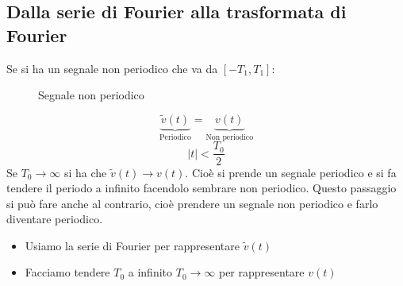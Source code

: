 \documentclass[a4paper]{article}
\begin{document}
\subsection{Dalla serie di Fourier alla trasformata di Fourier}
Se si ha un segnale non periodico che va da \( \left[ -T_1, T_1 \right] \):
\begin{figure}[H]
  \centering
  \caption{Segnale non periodico}
\end{figure}

\[
  \underbrace{\tilde{v}(t)}_{\text{Periodico}} = \underbrace{v(t)}_{\text{Non periodico}}
\] 
\[
|t| < \frac{T_0}{2}
\] 
Se \( T_0 \to \infty \) si ha che \( \tilde{v}(t) \to v(t) \). Cioè si prende un segnale
periodico e si fa tendere il periodo a infinito facendolo sembrare non periodico.
Questo passaggio si può fare anche al contrario, cioè prendere un segnale non periodico
e farlo diventare periodico.
\begin{itemize}
  \item Usiamo la serie di Fourier per rappresentare \( \tilde{v}(t) \) 
  \item Facciamo tendere \( T_0 \) a infinito \( T_0 \to \infty \) per rappresentare \( v(t) \)
\end{itemize}
\end{document}
